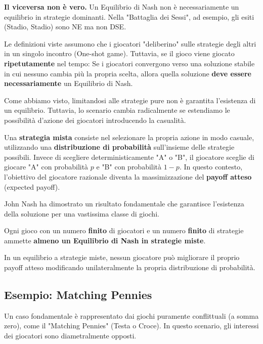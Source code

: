 \begin{osservazione}
\textbf{Il viceversa non è vero.} Un Equilibrio di Nash non è necessariamente un equilibrio in strategie dominanti. Nella "Battaglia dei Sessi", ad esempio, gli esiti (Stadio, Stadio) sono NE ma non DSE.
\end{osservazione}

Le definizioni viste assumono che i giocatori "deliberino" sulle strategie degli altri in un singolo incontro (One-shot game). Tuttavia, se il gioco viene giocato \textbf{ripetutamente} nel tempo:
Se i giocatori convergono verso una soluzione stabile in cui nessuno cambia più la propria scelta, allora quella soluzione \textbf{deve essere necessariamente} un Equilibrio di Nash.

Come abbiamo visto, limitandosi alle strategie pure non è garantita l'esistenza di un equilibrio. Tuttavia, lo scenario cambia radicalmente se estendiamo le possibilità d'azione dei giocatori introducendo la casualità.

\begin{definizione}
    Una \textbf{strategia mista} consiste nel selezionare la propria azione in modo casuale, utilizzando una \textbf{distribuzione di probabilità} sull'insieme delle strategie possibili.
    Invece di scegliere deterministicamente "A" o "B", il giocatore sceglie di giocare "A" con probabilità $p$ e "B" con probabilità $1-p$.
    In questo contesto, l'obiettivo del giocatore razionale diventa la massimizzazione del \textbf{payoff atteso} (expected payoff).
\end{definizione}
    

John Nash ha dimostrato un risultato fondamentale che garantisce l'esistenza della soluzione per una vastissima classe di giochi.

\begin{teorema}\label{th:nash}
Ogni gioco con un numero \textbf{finito} di giocatori e un numero \textbf{finito} di strategie ammette \textbf{almeno un Equilibrio di Nash in strategie miste}.
\end{teorema}

In un equilibrio a strategie miste, nessun giocatore può migliorare il proprio payoff atteso modificando unilateralmente la propria distribuzione di probabilità.

\subsection{Esempio: Matching Pennies}
Un caso fondamentale è rappresentato dai giochi puramente conflittuali (a somma zero), come il "Matching Pennies" (Testa o Croce). In questo scenario, gli interessi dei giocatori sono diametralmente opposti.

